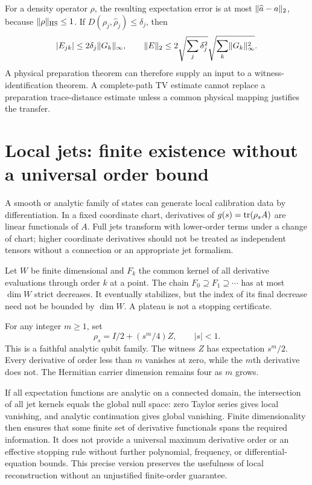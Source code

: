 For a density operator $\rho$, the resulting expectation error is at most $\lVert \widehat a-a\rVert_2$, because $\lVert \rho\rVert_{\mathrm{HS}}\le1$. If $D(\rho_j,\widehat\rho_j)\le\delta_j$, then
\[
|E_{jk}|\le2\delta_j\lVert G_k\rVert_\infty,
\qquad
\lVert E\rVert_2\le2\sqrt{\sum_j\delta_j^2}\sqrt{\sum_k\lVert G_k\rVert_\infty^2}.
\]
A physical preparation theorem can therefore supply an input to a witness-identification theorem. A complete-path TV estimate cannot replace a preparation trace-distance estimate unless a common physical mapping justifies the transfer.

\section{Local jets: finite existence without a universal order bound}\label{section:src:local-jets-finite-existence-without-a-universal-order-bound}
A smooth or analytic family of states can generate local calibration data by differentiation. In a fixed coordinate chart, derivatives of $g(s)=\operatorname{tr}(\rho_sA)$ are linear functionals of $A$. Full jets transform with lower-order terms under a change of chart; higher coordinate derivatives should not be treated as independent tensors without a connection or an appropriate jet formalism.

Let $W$ be finite dimensional and $F_k$ the common kernel of all derivative evaluations through order $k$ at a point. The chain $F_0\supseteq F_1\supseteq\cdots$ has at most $\dim W$ strict decreases. It eventually stabilizes, but the index of its final decrease need not be bounded by $\dim W$. A plateau is not a stopping certificate.

\begin{example}\label{ex:jets}
For any integer $m\ge1$, set
\[
\rho_s=I/2+(s^m/4)Z,\qquad |s|<1.
\]
This is a faithful analytic qubit family. The witness $Z$ has expectation $s^m/2$. Every derivative of order less than $m$ vanishes at zero, while the $m$th derivative does not. The Hermitian carrier dimension remains four as $m$ grows.
\end{example}

If all expectation functions are analytic on a connected domain, the intersection of all jet kernels equals the global null space: zero Taylor series gives local vanishing, and analytic continuation gives global vanishing. Finite dimensionality then ensures that some finite set of derivative functionals spans the required information. It does not provide a universal maximum derivative order or an effective stopping rule without further polynomial, frequency, or differential-equation bounds. This precise version preserves the usefulness of local reconstruction without an unjustified finite-order guarantee.

